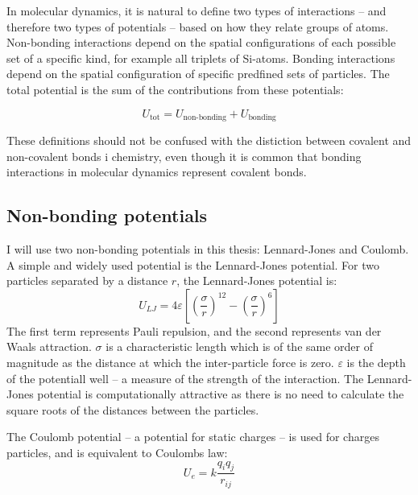 In molecular dynamics, it is natural to define two types of interactions -- and therefore two types of potentials -- based on how they relate groups of atoms. Non-bonding interactions depend on the spatial configurations of each possible set of a specific kind, for example all triplets of Si-atoms. Bonding interactions depend on the spatial configuration of specific predfined sets of particles. The total potential is the sum of the contributions from these potentials: 

\begin{equation}
	U_{\text{tot}} = U_{\text{non-bonding}} + U_{\text{bonding}} 
\end{equation}

These definitions should not be confused with the distiction between covalent and non-covalent bonds i chemistry, even though it is common that bonding interactions in molecular dynamics represent covalent bonds.

\subsection{Non-bonding potentials}
I will use two non-bonding potentials in this thesis: Lennard-Jones and Coulomb.
A simple and widely used potential is the Lennard-Jones potential. For two particles separated by a distance $r$, the Lennard-Jones potential is:
\begin{equation}
	U_{LJ} = 4\varepsilon\left[\left(\frac{\sigma}{r}\right)^{12} - \left(\frac{\sigma}{r}\right)^{6}\right]
\end{equation}
The first term represents Pauli repulsion, and the second represents van der Waals attraction. $\sigma$ is a characteristic length which is of the same order of magnitude as the distance at which the inter-particle force is zero. $\varepsilon$ is the depth of the potentiall well -- a measure of the strength of the interaction. The Lennard-Jones potential is computationally attractive as there is no need to calculate the square roots of the distances between the particles.

The Coulomb potential -- a potential for static charges -- is used for charges particles, and is equivalent to Coulombs law:
\begin{equation}
	U_e = k\frac{q_iq_j}{r_{ij}}
\end{equation}

